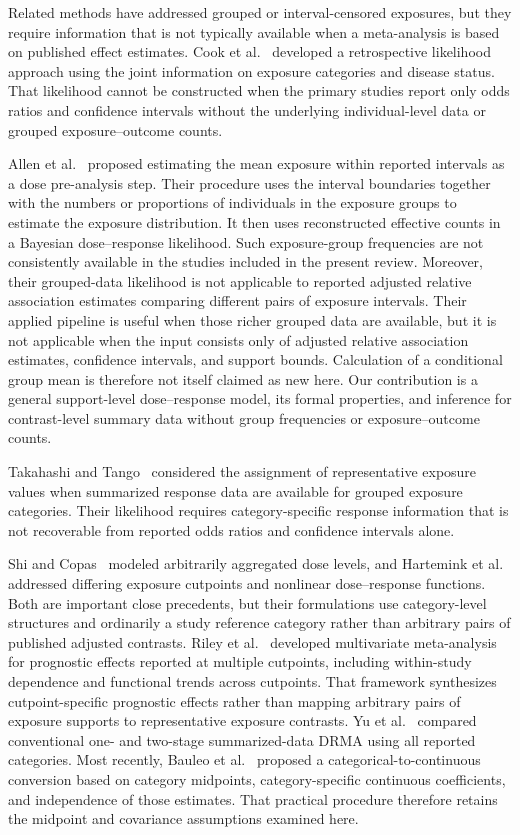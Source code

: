 \documentclass[journal=rsm]{CUP-JNL-DTM}%
\theoremstyle{definition}
\numberwithin{equation}{section}
\begin{document}
Related methods have addressed grouped or interval-censored exposures, but
they require information that is not typically available when a
meta-analysis is based on published effect estimates. Cook et
al.~\cite{Cook2001} developed a retrospective likelihood approach using the
joint information on exposure categories and disease status. That likelihood
cannot be constructed when the primary studies report only odds ratios and
confidence intervals without the underlying individual-level data or grouped
exposure--outcome counts.

Allen et al.~\cite{Allen2020,Allen2020b} proposed estimating the mean exposure
within reported intervals as a dose pre-analysis step. Their procedure uses
the interval boundaries together with the numbers or proportions of
individuals in the exposure groups to estimate the exposure distribution. It
then uses reconstructed effective counts in a Bayesian dose--response
likelihood. Such exposure-group frequencies are not consistently available in
the studies included in the present review. Moreover, their grouped-data
likelihood is not applicable to reported adjusted relative association
estimates comparing different pairs of exposure intervals. Their applied
pipeline is useful when those richer grouped data are available, but it is not
applicable when the input consists only of adjusted relative association
estimates, confidence intervals, and support bounds. Calculation of a
conditional group mean is therefore not itself claimed as new here. Our
contribution is a general support-level dose--response model, its formal
properties, and inference for contrast-level summary data without group
frequencies or exposure--outcome counts.

Takahashi and Tango~\cite{Takahashi2010} considered the assignment of
representative exposure values when summarized response data are available
for grouped exposure categories. Their likelihood requires
category-specific response information that is not recoverable from reported
odds ratios and confidence intervals alone.

Shi and Copas~\cite{ShiCopas2004} modeled arbitrarily aggregated dose levels,
and Hartemink et al.~\cite{Hartemink2006} addressed differing exposure
cutpoints and nonlinear dose--response functions. Both are important close
precedents, but their formulations use category-level structures and ordinarily
a study reference category rather than arbitrary pairs of published adjusted
contrasts. Riley et al.~\cite{Riley2015} developed multivariate meta-analysis
for prognostic effects reported at multiple cutpoints, including within-study
dependence and functional trends across cutpoints. That framework synthesizes
cutpoint-specific prognostic effects rather than mapping arbitrary pairs of
exposure supports to representative exposure contrasts. Yu et al.~\cite{Yu2013} compared conventional one- and two-stage
summarized-data DRMA using all reported categories. Most recently, Bauleo et
al.~\cite{Bauleo2026} proposed a categorical-to-continuous conversion based on
category midpoints, category-specific continuous coefficients, and independence
of those estimates. That practical procedure therefore retains the midpoint
and covariance assumptions examined here.
\end{document}
